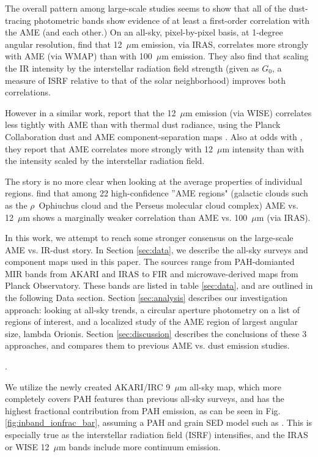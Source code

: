 \documentclass[preprint2,longabstract]{aastex}
\begin{document}
    The overall pattern among large-scale studies seems to show that all of the dust-tracing photometric bands show evidence of at least a first-order correlation with the AME (and each other.) On an all-sky, pixel-by-pixel basis, at 1-degree angular resolution, \cite{ysard10b} find that 12~$\mu$m emission, via IRAS, correlates more strongly with AME (via WMAP) than with 100~$\mu$m emission. They also find that scaling the IR intensity by the interstellar radiation field strength (given as $G_0$, a measure of ISRF relative to that of the solar neighborhood) improves both correlations.

    However in a similar work, \cite{hensley16} report that the 12~$\mu$m emission (via WISE) correlates less tightly with AME than with thermal dust radiance, using the Planck Collaboration dust and AME component-separation maps \citep{planck15X}. Also at odds with \cite{ysard10b}, they report that AME correlates more strongly with 12~$\mu$m intensity than with the intensity scaled by the interstellar radiation field.

     The story is no more clear when looking at the average properties of individual regions. \cite{planckXV} find that among 22 high-confidence ''AME regions" (galactic clouds such as the $\rho$~Ophiuchus cloud and the Perseus molecular cloud complex) AME vs. 12~$\mu$m  shows a marginally weaker correlation than AME vs. 100~$\mu$m (via IRAS).

     In this work, we attempt to reach some stronger consensus on the large-scale AME vs. IR-dust story. In Section \ref{sec:data}, we describe the all-sky surveys and component maps used in this paper. The sources range from PAH-domianted MIR bands from AKARI and IRAS to FIR and microwave-derived maps from Planck Observatory. These bands are listed in table \ref{sec:data}, and are outlined in the following Data section. Section  \ref{sec:analysis} describes our investigation approach: looking at all-sky trends, a circular aperture photometry on a list of regions of interest, and a localized study of the AME region of largest angular size, lambda Orionis. Section \ref{sec:discussion} describes the conclusions of these 3 approaches, and compares them to previous AME vs. dust emission studies.

  .

    We utilize the newly created AKARI/IRC 9~$\mu$m all-sky map, which more completely covers PAH features than previous all-sky surveys, and has the highest fractional contribution from PAH emission, as can be seen in Fig. \ref{fig:inband_ionfrac_bar}, assuming a PAH and grain SED model such as \cite{draine01}. This is especially true as the interstellar radiation field (ISRF) intensifies, and the IRAS or WISE 12~$\mu$m bands include more continuum emission.
\end{document}
